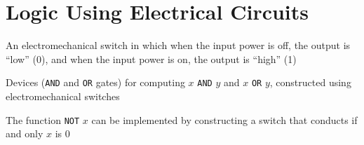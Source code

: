 \documentclass[8pt,a4paper,compress]{beamer}
\begin{document}
\section{Logic Using Electrical Circuits}
\begin{frame}[fragile]
\pause

An electromechanical switch in which when the input power is off, the output is ``low'' (0), and when the input power is on, the output is ``high'' (1)
\begin{center}
\end{center}

\pause
\bigskip

Devices (\lstinline{AND} and \lstinline{OR} gates) for computing $x$ \lstinline{AND} $y$ and $x$ \lstinline{OR} $y$, constructed using electromechanical switches
\begin{center}
\end{center}

\pause
\bigskip

The function \lstinline{NOT} $x$ can be implemented by constructing a switch that conducts if and only $x$ is 0
\end{frame}
\end{document}
